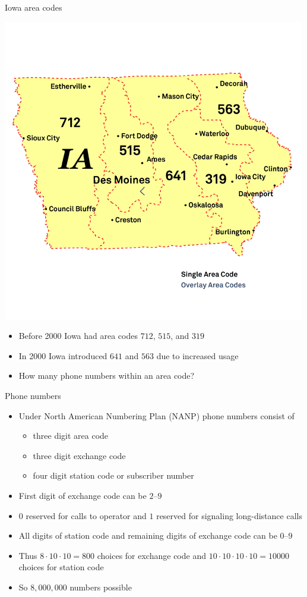 \documentclass{beamer}
\theoremstyle{definition}
\begin{document}
\begin{frame}{Iowa area codes}
\begin{multicols}{2}
\includegraphics[scale=.35]{Iowa}
\begin{itemize}
\item Before 2000 Iowa had area codes $712$, $515$, and $319$
\item In 2000 Iowa introduced $641$ and $563$ due to increased usage
\item How many phone numbers within an area code?
\end{itemize}
\end{multicols}
\end{frame}

\begin{frame}{Phone numbers}
\begin{itemize}
\item Under North American Numbering Plan (NANP)
phone numbers consist of 
\begin{itemize}
\item three digit \alert{area code}
\item three digit \alert{exchange code}
\item four digit \alert{station code} or \alert{subscriber number}
\end{itemize}
\item First digit of exchange code can be $2$--$9$
\item $0$ reserved for calls to operator and 
$1$ reserved for signaling long-distance calls
\item All digits of station code and remaining digits
of exchange code can be $0$--$9$
\item Thus $8\cdot 10\cdot 10=800$ choices
for exchange code and $10\cdot 10\cdot 10\cdot 10=10000$
choices for station code
\item So $8,000,000$ numbers possible
\end{itemize}
\end{frame}
\end{document}
